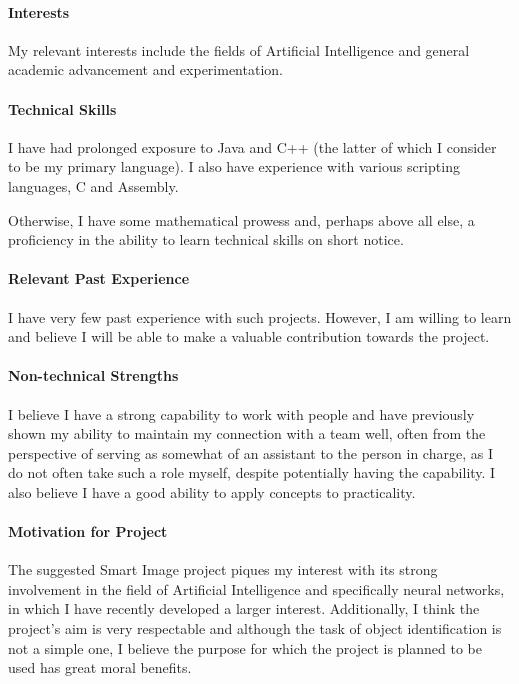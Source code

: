 \documentclass[12pt]{article}
\begin{document}
\paragraph{Interests}
My relevant interests include the fields of Artificial Intelligence and general academic advancement and experimentation.
\paragraph{Technical Skills}
I have had prolonged exposure to Java and C++ (the latter of which I consider to be my primary language). I also have experience with various scripting languages, C and Assembly.

Otherwise, I have some mathematical prowess and, perhaps above all else, a proficiency in the ability to learn technical skills on short notice.
\paragraph{Relevant Past Experience}
I have very few past experience with such projects. However, I am willing to learn and believe I will be able to make a valuable contribution towards the project.

\paragraph{Non-technical Strengths}
I believe I have a strong capability to work with people and have previously shown my ability to maintain my connection with a team well, often from the perspective of serving as somewhat of an assistant to the person in charge, as I do not often take such a role myself, despite potentially having the capability. 
\newline I also believe I have a good ability to apply concepts to practicality.
\paragraph{Motivation for Project}
The suggested Smart Image project piques my interest with its strong involvement in the field of Artificial Intelligence and specifically neural networks, in which I have recently developed a larger interest. Additionally, I think the project's aim is very respectable and although the task of object identification is not a simple one, I believe the purpose for which the project is planned to be used has great moral benefits.
\end{document}
